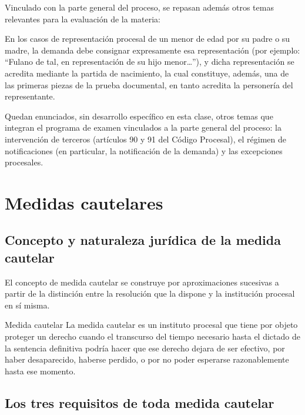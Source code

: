 \documentclass[12pt,oneside]{book}
\begin{document}
Vinculado con la parte general del proceso, se repasan además otros temas relevantes para la evaluación de la materia:

\begin{note}
En los casos de representación procesal de un menor de edad por su padre o su madre, la demanda debe consignar expresamente esa representación (por ejemplo: ``Fulano de tal, en representación de su hijo menor\ldots''), y dicha representación se acredita mediante la partida de nacimiento, la cual constituye, además, una de las primeras piezas de la prueba documental, en tanto acredita la personería del representante.
\end{note}

Quedan enunciados, sin desarrollo específico en esta clase, otros temas que integran el programa de examen vinculados a la parte general del proceso: la intervención de terceros (artículos 90 y 91 del Código Procesal), el régimen de notificaciones (en particular, la notificación de la demanda) y las excepciones procesales.

\chapter{Medidas cautelares}

\section{Concepto y naturaleza jurídica de la medida cautelar}

El concepto de medida cautelar se construye por aproximaciones sucesivas a partir de la distinción entre la resolución que la dispone y la institución procesal en sí misma.

\begin{definition}{Medida cautelar}
La medida cautelar es un instituto procesal que tiene por objeto proteger un derecho cuando el transcurso del tiempo necesario hasta el dictado de la sentencia definitiva podría hacer que ese derecho dejara de ser efectivo, por haber desaparecido, haberse perdido, o por no poder esperarse razonablemente hasta ese momento.
\end{definition}

\section{Los tres requisitos de toda medida cautelar}
\end{document}
